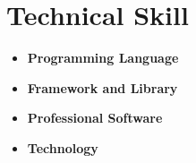 \documentclass[11pt,a4paper,sans]{moderncv}        %
\begin{document}
\section{Technical Skill}
\begin{itemize}
    \item \textbf{Programming Language} 
\end{itemize}
\begin{itemize}
    \item \textbf{Framework and Library} 
\end{itemize}
\begin{itemize}
    \item \textbf{Professional Software} 
\end{itemize}
\begin{itemize}
    \item \textbf{Technology} 
\end{itemize}
\end{document}
